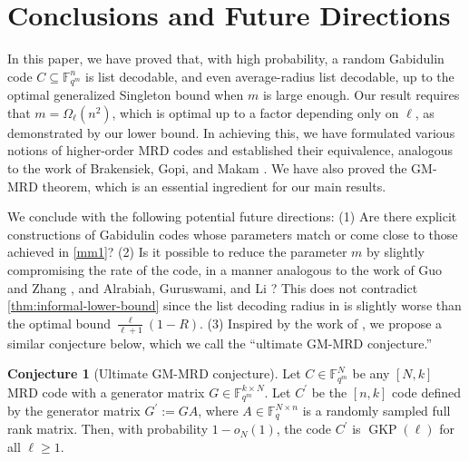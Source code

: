 \documentclass[11pt]{article}
\newif\ifmynotes
\newcommand{\CYnote}[1]{\ifmynotes\textcolor{orange}{[Chen: #1]}\else\fi}
\theoremstyle{plain}
\theoremstyle{definition}
\newtheorem{conj}[thm]{Conjecture}
\theoremstyle{remark}
\newcommand{\F}{\mathbb{F}}
\begin{document}

\section{Conclusions and Future Directions}
In this paper, we have proved that, with high probability, a random Gabidulin code $C\subseteq \F_{q^m}^n$ is list decodable, and even average-radius list decodable, up to the optimal generalized Singleton bound when $m$ is large enough.
Our result requires that $m=\Omega_{\ell}(n^2)$, which is optimal up to a factor depending only on $\ell$, as demonstrated by our lower bound. In achieving this, we have formulated various notions of higher-order MRD codes and established their equivalence, analogous to the work of Brakensiek, Gopi, and Makam \cite{brakensiek2023generic}. We have also proved the GM-MRD theorem, which is an essential ingredient for our main results.

We conclude with the following potential future directions: (1) Are there explicit constructions of Gabidulin codes whose parameters match or come close to those achieved in \cref{mm1}? (2) Is it possible to reduce the parameter $m$ by slightly compromising the rate of the code, in a manner analogous to the work of Guo and Zhang \cite{guo2023randomly}, and Alrabiah, Guruswami, and Li \cite{alrabiah2023randomly}? This does not contradict \cref{thm:informal-lower-bound}
since the list decoding radius in \cite{guo2023randomly, alrabiah2023randomly} is slightly worse than the optimal bound $\frac{\ell}{\ell+1}(1-R)$.
(3) Inspired by the work of \cite{brakensiek2023generalized}, we propose a similar conjecture below, which we call the ``ultimate GM-MRD conjecture.''
\begin{conj}[Ultimate GM-MRD conjecture]
    Let $C\in\F_{q^m}^N$ be any $[N,k]$ MRD code with a generator matrix $G\in\F_{q^m}^{k\times N}$. Let $C^{\prime}$ be the $[n,k]$ code defined by the generator matrix $G^{\prime}:=GA$, where $A\in\F_q^{N\times n}$ is a randomly sampled full rank matrix. Then, with probability $1-o_N(1)$, the code $C^{\prime}$ is $\operatorname{GKP}(\ell)$ for all $\ell\ge 1$.
\end{conj}
\end{document}
